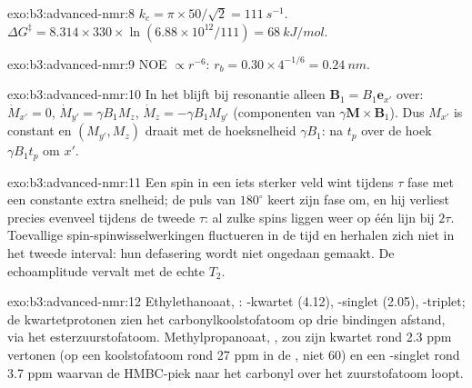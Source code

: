 \begin{solution}{exo:b3:advanced-nmr:8}
$k_c = \pi \times 50/\sqrt2 = \qty{111}{s^{-1}}$. $\Delta G^\ddagger = 8.314 \times 330 \times
\ln(6.88\times10^{12}/111) = \qty{68}{kJ/mol}$.
\end{solution}

\begin{solution}{exo:b3:advanced-nmr:9}
NOE $\propto r^{-6}$: $r_b = 0.30 \times 4^{-1/6} = \qty{0.24}{nm}$.
\end{solution}

\begin{solution}{exo:b3:advanced-nmr:10}
In het  blijft bij resonantie alleen $\mathbf B_1 = B_1\mathbf e_{x'}$ over:
$\dot M_{x'} = 0$, $\dot M_{y'} = \gamma B_1M_z$, $\dot M_z = -\gamma B_1M_{y'}$ (componenten van
$\gamma\mathbf M\times\mathbf B_1$). Dus $M_{x'}$ is constant en $(M_{y'}, M_z)$
draait met de hoeksnelheid $\gamma B_1$: na $t_p$ over de hoek $\gamma B_1t_p$ om $x'$.
\end{solution}

\begin{solution}{exo:b3:advanced-nmr:11}
Een spin in een iets sterker veld wint tijdens $\tau$ fase met een
constante extra snelheid; de puls van $180^\circ$ keert zijn fase om, en hij
verliest precies evenveel tijdens de tweede $\tau$: al zulke spins liggen
weer op één lijn bij $2\tau$. Toevallige spin-spinwisselwerkingen
fluctueren in de tijd en herhalen zich niet in het tweede interval: hun
defasering wordt niet ongedaan gemaakt. De echoamplitude vervalt met de
echte $T_2$.
\end{solution}

\begin{solution}{exo:b3:advanced-nmr:12}
Ethylethanoaat, : -kwartet (4.12), -singlet
(2.05), -triplet; de kwartetprotonen zien het carbonylkoolstofatoom
op drie bindingen afstand, via het esterzuurstofatoom. Methylpropanoaat,
, zou zijn kwartet rond 2.3 ppm vertonen (op een
koolstofatoom rond 27 ppm in de , niet 60) en een -singlet
rond 3.7 ppm waarvan de HMBC-piek naar het carbonyl over het zuurstofatoom
loopt.
\end{solution}


